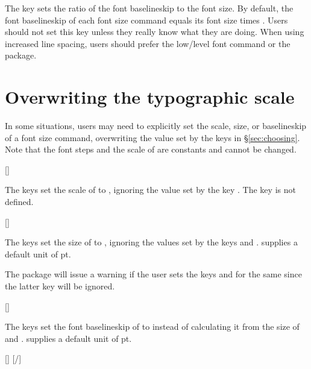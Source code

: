 \documentclass{beery}
\begin{document}
The key  sets the ratio of the font baselineskip to the font size.
By default, the font baselineskip of each font size command equals its font size times .
Users should not set this key unless they really know what they are doing.
When using increased line spacing, users should prefer the low\-/level font command  or the  package.


\section{Overwriting the typographic scale}
\label{sec:overwriting}

In some situations, users may need to explicitly set the scale, size, or baselineskip of a font size command, overwriting the value set by the keys in \S\ref{sec:choosing}.
Note that the font steps and the scale of  are constants and cannot be changed.

[]
\KeepNextPar*

The keys  set the scale of  to , ignoring the value set by the key .
The key  is not defined.

[]
\KeepNextPar*

The keys  set the size of  to , ignoring the values set by the keys  and .
 supplies a default unit of \unit{pt}.

The package will issue a warning if the user sets the keys  and  for the same  since the latter key will be ignored.

[]
\KeepNextPar*

The keys  set the font baselineskip of  to  instead of calculating it from the size of  and .
 supplies a default unit of \unit{pt}.

[]
\nopagebreak\newline
{}[/]
\end{document}
